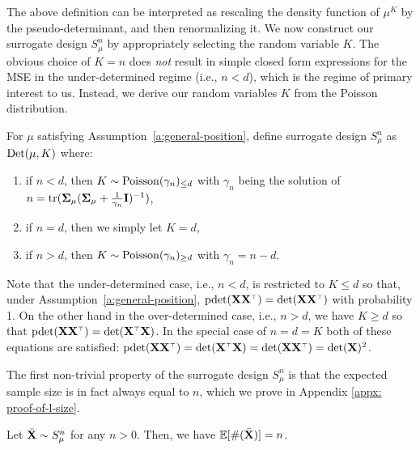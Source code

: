 \documentclass[11pt]{article}
\begin{document}
\noindent
The above definition can be
interpreted as rescaling the density function of $\mu^K$ by the
pseudo-determinant, and then renormalizing it.
We now construct our surrogate design $S_\mu^n$ by appropriately
selecting the random variable $K$.
The obvious choice of $K=n$ does \emph{not} result in simple closed form expressions for the MSE in the under-determined regime (i.e., $n<d$), which is the regime of primary interest to us.
Instead, we derive our random variables $K$ from the Poisson distribution.
\begin{definition}\label{d:surrogate}
For $\mu$ satisfying Assumption~\ref{a:general-position},
define surrogate design $S_\mu^n$ as ${\mathrm{Det}}(\mu,K)$ where:
\vspace{-2mm}
    \begin{enumerate}
\item if $n<d$, then $K\sim {\operatorname{Poisson}}(\gamma_n)_{\leq d}$ with
 $\gamma_n$ being the solution of
 $n=\mathrm{tr}(\mathbf{\Sigma}_\mu(\mathbf{\Sigma}_\mu+\frac1{\gamma_n}\mathbf I)^{-1})$,
 \vspace{-2mm}
\item if $n=d$, then we simply let $K=d$,
  \vspace{-2mm}
\item if $n>d$, then $K\sim{\operatorname{Poisson}}(\gamma_n)_{\geq d}$ with $\gamma_n=n-d$.
\end{enumerate}
\end{definition}

\noindent
Note that the under-determined case, i.e., $n<d$, is restricted to $K\leq d$ so that, under Assumption~\ref{a:general-position}, $\pdet(\X\X^\top)=\det(\X\X^\top)$ with probability 1.
On the other hand in the over-determined case, i.e., $n>d$, we have
$K\geq d$ so that $\pdet(\X\X^\top)=\det(\X^\top\X)$. In the special case
of $n=d=K$ both of these equations are satisfied: $\pdet(\X\X^\top)=\det(\X^\top\X)=\det(\X\X^\top)=\det(\X)^2$.

The first non-trivial property of the surrogate design $S_\mu^n$ is
that the expected sample size is in fact always equal to $n$, which we
prove in Appendix \ref{appx: proof-of-l-size}.
\begin{lemma} \label{l:size}
Let ${\bar{\mathbf X}}\sim S_\mu^n$ for any $n>0$.
 Then, we have $\mathbb E[\#({\bar{\mathbf X}})] = n$.
\end{lemma}
\end{document}
